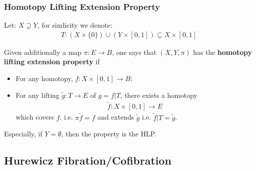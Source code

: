\documentclass[Total.tex]{subfiles}
\begin{document}
				\subsubsection{Homotopy Lifting Extension Property}
					\begin{Def}
						Let: $X\supseteq Y$, for simlicity we denote:
						\begin{gather*}
							T:(X\times \{0\})\cup (Y\times [0,1])\subseteq X\times [0,1]
						\end{gather*}
						
						Given additionally a map $\pi:E\rightarrow B$, one says that $(X,Y,\pi
						)$ has the \textbf{homotopy lifting extension property} if
						\begin{itemize}
							\item For any homotopy, $f:X\times [0,1]\rightarrow B$;
							\item For any lifting $\tilde{g}:T\rightarrow E$ of $g=f|T$, there exists a homotopy 
							\begin{gather*}
								\tilde{f}:X\times [0,1]\rightarrow E
							\end{gather*}
							which covers $f$. i.e. $\pi \tilde{f}=f$ and extends $\tilde{g}$ i.e. $\tilde{f}|T=\tilde{g}$.
						\end{itemize}
						
						\begin{center}
						\end{center}
						
						Especially, if $Y=\emptyset$, then the property is the HLP.
					\end{Def}
			\subsection{Hurewicz Fibration/Cofibration}
\end{document}
